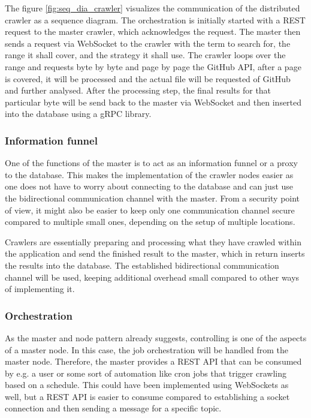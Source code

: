 The figure \ref{fig:seq_dia_crawler} visualizes the communication of the distributed crawler as a sequence diagram. The orchestration is initially started with a REST request to the master crawler, which acknowledges the request. The master then sends a request via WebSocket to the crawler with the term to search for, the range it shall cover, and the strategy it shall use. The crawler loops over the range and requests byte by byte and page by page the GitHub API, after a page is covered, it will be processed and the actual file will be requested of GitHub and further analysed. After the processing step, the final results for that particular byte will be send back to the master via WebSocket and then inserted into the database using a gRPC library.

\subsubsection{Information funnel}
\label{sec:informationfunnel}
One of the functions of the master is to act as an information funnel or a proxy to the database. This makes the implementation of the crawler nodes easier as one does not have to worry about connecting to the database and can just use the bidirectional communication channel with the master. From a security point of view, it might also be easier to keep only one communication channel secure compared to multiple small ones, depending on the setup of multiple locations.

Crawlers are essentially preparing and processing what they have crawled within the application and send the finished result to the master, which in return inserts the results into the database. The established bidirectional communication channel will be used, keeping additional overhead small compared to other ways of implementing it.

\subsubsection{Orchestration}
\label{sec:orchestration}
As the master and node pattern already suggests, controlling is one of the aspects of a master node. In this case, the job orchestration will be handled from the master node. Therefore, the master provides a REST API that can be consumed by e.g. a user or some sort of automation like cron jobs that trigger crawling based on a schedule. This could have been implemented using WebSockets as well, but a REST API is easier to consume compared to establishing a socket connection and then sending a message for a specific topic.

